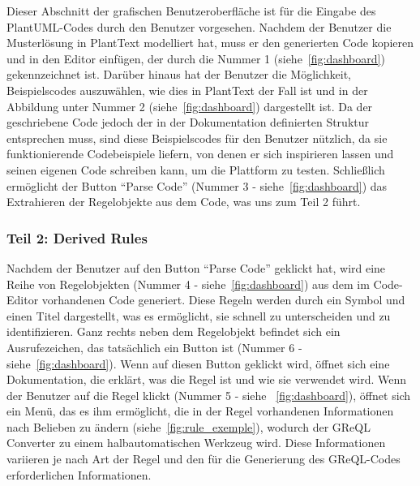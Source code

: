 Dieser Abschnitt der grafischen Benutzeroberfläche ist für die Eingabe des PlantUML-Codes durch den Benutzer vorgesehen.
Nachdem der Benutzer die Musterlösung in PlantText modelliert hat, muss er den generierten Code kopieren und in den
Editor einfügen, der durch die Nummer 1 (siehe~\ref{fig:dashboard}) gekennzeichnet ist. Darüber hinaus hat der Benutzer die
Möglichkeit, Beispielscodes auszuwählen, wie dies in PlantText der Fall ist und in der Abbildung unter Nummer 2 (siehe~\ref{fig:dashboard})
dargestellt ist. Da der geschriebene Code jedoch der in der Dokumentation definierten Struktur entsprechen muss, sind
diese Beispielscodes für den Benutzer nützlich, da sie funktionierende Codebeispiele liefern, von denen er sich
inspirieren lassen und seinen eigenen Code schreiben kann, um die Plattform zu testen. Schließlich ermöglicht der
Button ``Parse Code'' (Nummer 3 - siehe~\ref{fig:dashboard}) das Extrahieren der Regelobjekte aus dem Code, was uns zum
Teil 2 führt.

\subsubsection{Teil 2: Derived Rules}

Nachdem der Benutzer auf den Button ``Parse Code'' geklickt hat, wird eine Reihe von Regelobjekten
(Nummer 4 - siehe~\ref{fig:dashboard}) aus dem im Code-Editor vorhandenen Code generiert. Diese Regeln werden durch ein
Symbol und einen Titel dargestellt, was es ermöglicht, sie schnell zu unterscheiden und zu identifizieren. Ganz rechts
neben dem Regelobjekt befindet sich ein Ausrufezeichen, das tatsächlich ein Button ist (Nummer 6 - siehe~\ref{fig:dashboard}).
Wenn auf diesen Button geklickt wird, öffnet sich eine Dokumentation, die erklärt, was die Regel ist und wie sie
verwendet wird. Wenn der Benutzer auf die Regel klickt (Nummer 5 - siehe ~\ref{fig:dashboard}), öffnet sich ein Menü,
das es ihm ermöglicht, die in der Regel vorhandenen Informationen nach Belieben zu ändern (siehe~\ref{fig:rule_exemple}),
wodurch der GReQL Converter zu einem halbautomatischen Werkzeug wird. Diese Informationen variieren je nach Art der Regel
und den für die Generierung des GReQL-Codes erforderlichen Informationen.

